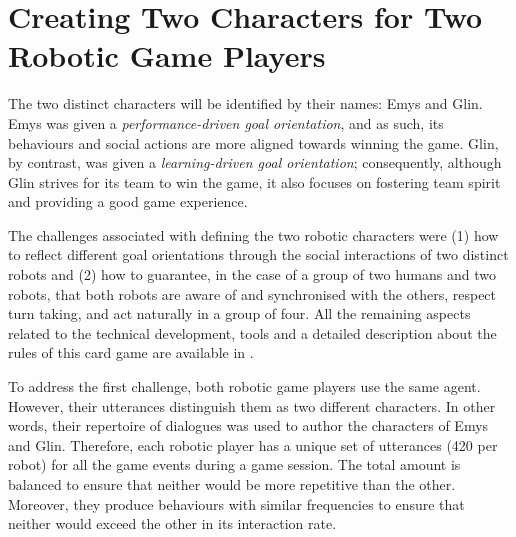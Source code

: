 \section{Creating Two Characters for Two Robotic Game Players}
\label{sec:two-characters}
The two distinct characters will be identified by their names: Emys and Glin.
Emys was given a \emph{performance-driven goal orientation}, and as such, its behaviours and social actions are more aligned towards winning the game. Glin, by contrast, was given a \emph{learning-driven goal orientation}; consequently, although Glin strives for its team to win the game, it also focuses on fostering team spirit and providing a good game experience.


The challenges associated with defining the two ro\-bo\-tic characters were (1) how to reflect different goal orientations through the social interactions of two distinct robots and (2) how to guarantee, in the case of a group of two humans and two robots, that both robots are aware of and synchronised with the others, respect turn taking, and act naturally in a group of four. All the remaining aspects related to the technical development, tools and a detailed description about the rules of this card game are available in \cite{correia2018choose}.


To address the first challenge, both robotic game players use the same agent. However, their utterances distinguish them as two different characters. In other words, their repertoire of dialogues was used to author the characters of Emys and Glin. Therefore, each robotic player has a unique set of utterances (420 per robot) for all the game events during a game session. The total amount is balanced to ensure that neither would be more repetitive than the other. Moreover, they produce behaviours with similar frequencies to ensure that neither would exceed the other in its interaction rate.

